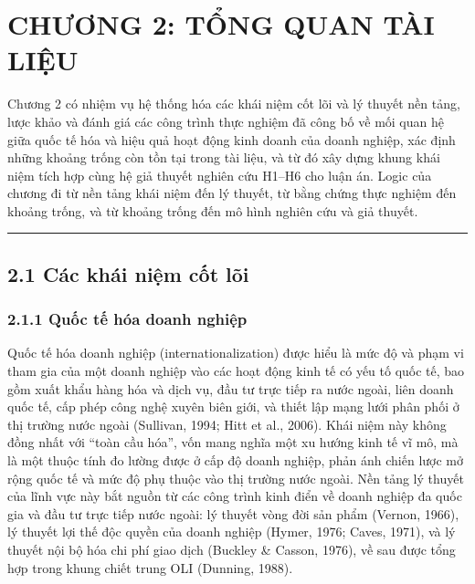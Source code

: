 \documentclass[
  a4paper,
  13pt]{extreport}
\author{}
\date{}
\begin{document}
\hypertarget{chux1b0ux1a1ng-2-tux1ed5ng-quan-tuxe0i-liux1ec7u}{%
\chapter{CHƯƠNG 2: TỔNG QUAN TÀI
LIỆU}\label{chux1b0ux1a1ng-2-tux1ed5ng-quan-tuxe0i-liux1ec7u}}

Chương 2 có nhiệm vụ hệ thống hóa các khái niệm cốt lõi và lý thuyết nền
tảng, lược khảo và đánh giá các công trình thực nghiệm đã công bố về mối
quan hệ giữa quốc tế hóa và hiệu quả hoạt động kinh doanh của doanh
nghiệp, xác định những khoảng trống còn tồn tại trong tài liệu, và từ đó
xây dựng khung khái niệm tích hợp cùng hệ giả thuyết nghiên cứu H1--H6
cho luận án. Logic của chương đi từ nền tảng khái niệm đến lý thuyết, từ
bằng chứng thực nghiệm đến khoảng trống, và từ khoảng trống đến mô hình
nghiên cứu và giả thuyết.

\begin{center}\rule{0.5\linewidth}{0.5pt}\end{center}

\hypertarget{cuxe1c-khuxe1i-niux1ec7m-cux1ed1t-luxf5i}{%
\section{2.1 Các khái niệm cốt
lõi}\label{cuxe1c-khuxe1i-niux1ec7m-cux1ed1t-luxf5i}}

\hypertarget{quux1ed1c-tux1ebf-huxf3a-doanh-nghiux1ec7p}{%
\subsection{2.1.1 Quốc tế hóa doanh
nghiệp}\label{quux1ed1c-tux1ebf-huxf3a-doanh-nghiux1ec7p}}

Quốc tế hóa doanh nghiệp (internationalization) được hiểu là mức độ và
phạm vi tham gia của một doanh nghiệp vào các hoạt động kinh tế có yếu
tố quốc tế, bao gồm xuất khẩu hàng hóa và dịch vụ, đầu tư trực tiếp ra
nước ngoài, liên doanh quốc tế, cấp phép công nghệ xuyên biên giới, và
thiết lập mạng lưới phân phối ở thị trường nước ngoài (Sullivan, 1994;
Hitt et al., 2006). Khái niệm này không đồng nhất với ``toàn cầu hóa'',
vốn mang nghĩa một xu hướng kinh tế vĩ mô, mà là một thuộc tính đo lường
được ở cấp độ doanh nghiệp, phản ánh chiến lược mở rộng quốc tế và mức
độ phụ thuộc vào thị trường nước ngoài. Nền tảng lý thuyết của lĩnh vực
này bắt nguồn từ các công trình kinh điển về doanh nghiệp đa quốc gia và
đầu tư trực tiếp nước ngoài: lý thuyết vòng đời sản phẩm (Vernon, 1966),
lý thuyết lợi thế độc quyền của doanh nghiệp (Hymer, 1976; Caves, 1971),
và lý thuyết nội bộ hóa chi phí giao dịch (Buckley \& Casson, 1976), về
sau được tổng hợp trong khung chiết trung OLI (Dunning, 1988).
\end{document}

